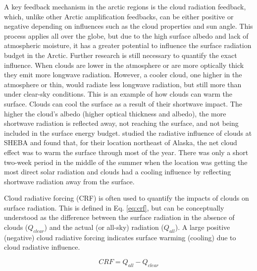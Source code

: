 A key feedback mechanism in the arctic regions is the cloud radiation feedback, which, unlike other Arctic amplification feedbacks, can be either positive or negative depending on influences such as the cloud properties and sun angle. This process applies all over the globe, but due to the high surface albedo and lack of atmospheric moisture, it has a greater potential to influence the surface radiation budget in the Arctic. Further research is still necessary to quantify the exact influence. When clouds are lower in the atmosphere or are more optically thick they emit more longwave radiation. However, a cooler cloud, one higher in the atmosphere or thin, would radiate less longwave radiation, but still more than under clear-sky conditions. This is an example of how clouds can warm the surface. Clouds can cool the surface as a result of their shortwave impact. The higher the cloud's albedo (higher optical thickness and albedo), the more shortwave radiation is reflected away, not reaching the surface, and not being included in the surface energy budget. \citet{intrieri:2002} studied the radiative influence of clouds at SHEBA and found that, for their location northeast of Alaska, the net cloud effect was to warm the surface through most of the year. There was only a short two-week period in the middle of the summer when the location was getting the most direct solar radiation and clouds had a cooling influence by reflecting shortwave radiation away from the surface. 

Cloud radiative forcing (CRF) is often used to quantify the impacts of clouds on surface radiation. This is defined in Eq. \ref{eq:crf}, but can be conceptually understood as the difference between the surface radiation in the absence of clouds ($Q_{clear}$) and the actual (or all-sky) radiation ($Q_{all}$). A large positive (negative) cloud radiative forcing indicates surface warming (cooling) due to cloud radiative influence. 

\begin{equation}\label{eq:crf}
CRF = Q_{all} - Q_{clear} 
\end{equation}

